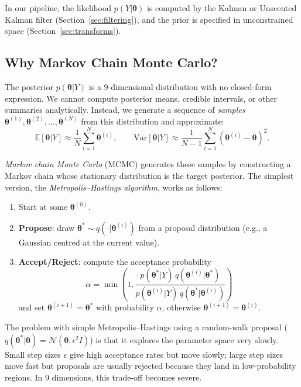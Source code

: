 \documentclass[11pt,a4paper]{article}
\theoremstyle{definition}
\newcommand{\E}{\mathbb{E}}
\newcommand{\Var}{\mathrm{Var}}
\newcommand{\btheta}{\boldsymbol{\theta}}
\begin{document}
	In our pipeline, the likelihood $p(Y|\btheta)$ is computed by the Kalman or Unscented Kalman filter (Section~\ref{sec:filtering}), and the prior is specified in unconstrained space (Section~\ref{sec:transforms}).
	
	\subsection{Why Markov Chain Monte Carlo?}
	\label{sec:mcmc_intro}
	
	The posterior $p(\btheta|Y)$ is a 9-dimensional distribution with no closed-form expression.
	We cannot compute posterior means, credible intervals, or other summaries analytically.
	Instead, we generate a sequence of \emph{samples} $\btheta^{(1)}, \btheta^{(2)}, \ldots, \btheta^{(N)}$ from this distribution and approximate:
	\begin{equation}
		\E[\btheta | Y] \approx \frac{1}{N} \sum_{i=1}^N \btheta^{(i)}, \qquad \Var[\btheta | Y] \approx \frac{1}{N-1}\sum_{i=1}^N (\btheta^{(i)} - \bar{\btheta})^2.
	\end{equation}
	
	\emph{Markov chain Monte Carlo} (MCMC) generates these samples by constructing a Markov chain whose stationary distribution is the target posterior.
	The simplest version, the \emph{Metropolis--Hastings algorithm}, works as follows:
	\begin{enumerate}
		\item Start at some $\btheta^{(0)}$.
		\item \textbf{Propose}: draw $\btheta^* \sim q(\cdot | \btheta^{(i)})$ from a proposal distribution (e.g., a Gaussian centred at the current value).
		\item \textbf{Accept/Reject}: compute the acceptance probability
		\begin{equation}
			\alpha = \min\!\left(1, \frac{p(\btheta^*|Y) \, q(\btheta^{(i)}|\btheta^*)}{p(\btheta^{(i)}|Y) \, q(\btheta^*|\btheta^{(i)})}\right)
		\end{equation}
		and set $\btheta^{(i+1)} = \btheta^*$ with probability $\alpha$, otherwise $\btheta^{(i+1)} = \btheta^{(i)}$.
	\end{enumerate}
	
	The problem with simple Metropolis--Hastings using a random-walk proposal ($q(\btheta^*|\btheta) = \mathcal{N}(\btheta, \epsilon^2 I)$) is that it explores the parameter space very slowly.
	Small step sizes $\epsilon$ give high acceptance rates but move slowly; large step sizes move fast but proposals are usually rejected because they land in low-probability regions.
	In 9 dimensions, this trade-off becomes severe.
	
\end{document}
